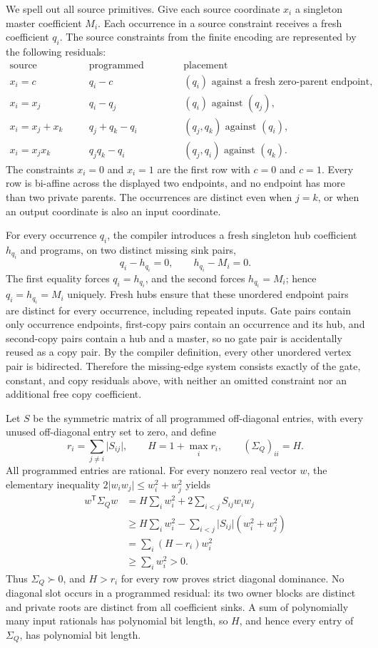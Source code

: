 We spell out all source primitives.  Give each source coordinate \(x_i\) a singleton master coefficient \(M_i\).  Each occurrence in a source constraint receives a fresh coefficient \(q_i\).  The source constraints from the finite encoding are represented by the following residuals:
\[
\begin{array}{c|c|c}
\text{source constraint}&\text{programmed residual}&\text{placement}\\ \hline
x_i=c&q_i-c&(q_i)\text{ against a fresh zero-parent endpoint},\\
x_i=x_j&q_i-q_j&(q_i)\text{ against }(q_j),\\
x_i=x_j+x_k&q_j+q_k-q_i&(q_j,q_k)\text{ against }(q_i),\\
x_i=x_jx_k&q_jq_k-q_i&(q_j,q_i)\text{ against }(q_k).
\end{array}
\]
The constraints \(x_i=0\) and \(x_i=1\) are the first row with \(c=0\) and \(c=1\).  Every row is bi-affine across the displayed two endpoints, and no endpoint has more than two private parents.  The occurrences are distinct even when \(j=k\), or when an output coordinate is also an input coordinate.

For every occurrence \(q_i\), the compiler introduces a fresh singleton hub coefficient \(h_{q_i}\) and programs, on two distinct missing sink pairs,
\[
q_i-h_{q_i}=0,
\qquad
h_{q_i}-M_i=0.
\]
The first equality forces \(q_i=h_{q_i}\), and the second forces \(h_{q_i}=M_i\); hence \(q_i=h_{q_i}=M_i\) uniquely.  Fresh hubs ensure that these unordered endpoint pairs are distinct for every occurrence, including repeated inputs.  Gate pairs contain only occurrence endpoints, first-copy pairs contain an occurrence and its hub, and second-copy pairs contain a hub and a master, so no gate pair is accidentally reused as a copy pair.  By the compiler definition, every other unordered vertex pair is bidirected.  Therefore the missing-edge system consists exactly of the gate, constant, and copy residuals above, with neither an omitted constraint nor an additional free copy coefficient.

Let \(S\) be the symmetric matrix of all programmed off-diagonal entries, with every unused off-diagonal entry set to zero, and define
\[
r_i=\sum_{j\ne i}\lvert S_{ij}\rvert,
\qquad
H=1+\max_i r_i,
\qquad
(\Sigma_Q)_{ii}=H.
\]
All programmed entries are rational.  For every nonzero real vector \(w\), the elementary inequality \(2\lvert w_iw_j\rvert\leq w_i^2+w_j^2\) yields
\[
\begin{aligned}
w^{\mathsf T}\Sigma_Qw
&=H\sum_i w_i^2+2\sum_{i<j}S_{ij}w_iw_j\\
&\geq H\sum_iw_i^2-
  \sum_{i<j}\lvert S_{ij}\rvert(w_i^2+w_j^2)\\
&=\sum_i(H-r_i)w_i^2\\
&\geq\sum_iw_i^2>0.
\end{aligned}
\]
Thus \(\Sigma_Q\succ0\), and \(H>r_i\) for every row proves strict diagonal dominance.  No diagonal slot occurs in a programmed residual: its two owner blocks are distinct and private roots are distinct from all coefficient sinks.  A sum of polynomially many input rationals has polynomial bit length, so \(H\), and hence every entry of \(\Sigma_Q\), has polynomial bit length.

